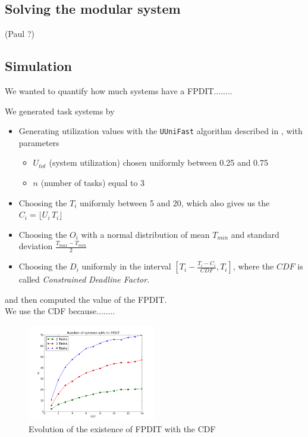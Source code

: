\documentclass[times, 10pt,twocolumn, a4paper]{article}
\begin{document}
	\subsection{Solving the modular system}

	(Paul ?)

	\subsection{Simulation}

	We wanted to quantify how much systems have a FPDIT........

	We generated task systems by
	\begin{itemize}
		\item Generating utilization values with the \texttt{UUniFast} algorithm described in \cite{bini2005measuring}, with parameters
		\begin{itemize}
			\item $U_{tot}$ (system utilization) chosen uniformly between 0.25 and 0.75
			\item $n$ (number of tasks) equal to 3
		\end{itemize}
		\item Choosing the $T_i$ uniformly between 5 and 20, which also gives us the $C_i = \lfloor U_i \, T_i \rfloor$
		\item Choosing the $O_i$ with a normal distribution of mean $T_{min}$ and standard deviation $\frac{T_{max} - T_{min}}{2}$
		\item Choosing the $D_i$ uniformly in the interval $[T_i - \frac{T_i - C_i}{CDF}, T_i]$, where the $CDF$ is called \emph{Constrained Deadline Factor}.
	\end{itemize}
	and then computed the value of the FPDIT.\\

	We use the CDF because........\\

	\begin{figure}[h]
	\begin{center}
		\includegraphics[width=0.5\textwidth]{python-simulation/plots/nofpdit.png}
	\end{center}
	\caption{Evolution of the existence of FPDIT with the CDF}
	\label{fig:noFPDIT}
	\end{figure}
\end{document}
